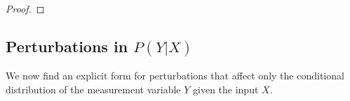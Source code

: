 \documentclass{article}
\newcommand{\Okc}{\Omega_{K, c, \varepsilon}}
\newcommand{\phifix}{\phi_{\lambda, G}}
\theoremstyle{definition}
\theoremstyle{remarksty}
\begin{document}
\begin{proof}
\end{proof}


\subsection{Perturbations in $P(Y|X)$}\label{sec:reg-y|x}
We now find an explicit form for perturbations that affect only the conditional distribution of the measurement variable $Y$ given the input $X$.
   
\end{document}
